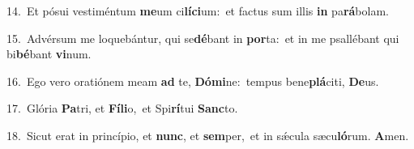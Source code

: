 {\numbfont\textcolor{\numbcolor}{14.}}~Et pósui vestiméntum \textbf{me}\-um ci\-\textbf{lí}\-\textbf{ci}um:~\star et factus sum illis \textbf{in} pa\-\textbf{rá}\-bolam.\par
{\numbfont\textcolor{\numbcolor}{15.}}~Advérsum me loquebántur, qui se\-\textbf{dé}\-bant in \textbf{por}\-ta:~\star et in me psallébant qui bi\-\textbf{bé}\-bant \textbf{vi}\-num.\par
{\numbfont\textcolor{\numbcolor}{16.}}~Ego vero oratiónem meam \textbf{ad} te, \textbf{Dó}\-\textbf{mi}ne:~\star tempus bene\-\textbf{plá}\-citi, \textbf{De}\-us.\par
{\numbfont\textcolor{\numbcolor}{17.}}~Glória \textbf{Pa}\-tri, et \textbf{Fí}\-\textbf{li}o,~\star et Spi\-\textbf{rí}\-tui \textbf{Sanc}\-to.\par
{\numbfont\textcolor{\numbcolor}{18.}}~Sicut erat in princípio, et \textbf{nunc}\-, et \textbf{sem}\-per,~\star et in sǽcula sæcu\-\textbf{ló}\-rum. \textbf{A}\-men.\par
